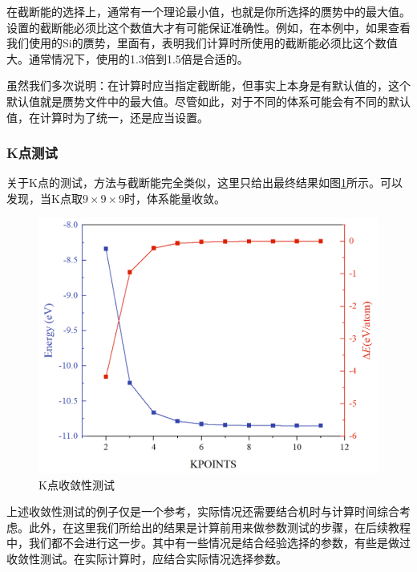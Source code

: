 \begin{attention}
    在截断能的选择上，通常有一个理论最小值，也就是你所选择的赝势中的最大值。设置的截断能必须比这个数值大才有可能保证准确性。例如，在本例中，如果查看我们使用的Si的赝势，里面有，表明我们计算时所使用的截断能必须比这个数值大。通常情况下，使用的1.3倍到1.5倍是合适的。
\end{attention}

\begin{extend}
    虽然我们多次说明：在计算时应当指定截断能，但事实上本身是有默认值的，这个默认值就是赝势文件中的最大值。尽管如此，对于不同的体系可能会有不同的默认值，在计算时为了统一，还是应当设置。
\end{extend}

\subsubsection{K点测试}

关于K点的测试，方法与截断能完全类似，这里只给出最终结果如图\ref{fig:能量计算-K点收敛性测试}所示。可以发现，当K点取$9\times9\times9$时，体系能量收敛。

\begin{figure}
    \centering
    \includegraphics[width=1\linewidth]{VASP计算/静态自洽与电荷密度/能量计算/fig/K点收敛性测试.png}
    \caption{K点收敛性测试}
    \label{fig:能量计算-K点收敛性测试}
\end{figure}

\begin{attention}
    上述收敛性测试的例子仅是一个参考，实际情况还需要结合机时与计算时间综合考虑。此外，在这里我们所给出的结果是计算前用来做参数测试的步骤，在后续教程中，我们都不会进行这一步。其中有一些情况是结合经验选择的参数，有些是做过收敛性测试。在实际计算时，应结合实际情况选择参数。
\end{attention}


